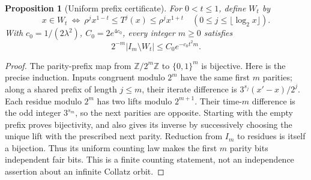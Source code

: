 \documentclass[11pt]{article}
\newtheorem{proposition}{Proposition}
\theoremstyle{remark}\newtheorem{remark}[proposition]{Remark}
\begin{document}
\begin{proposition}[Uniform prefix certificate]
\label{prop:shaik-prefix-uniform}
For \(0<t\le1\), define \(W_t\) by
\[
 x\in W_t\ \Longleftrightarrow\
 \rho^j x^{1-t}\le T^j(x)\le\rho^j x^{1+t}
 \quad(0\le j\le\lfloor\log_2x\rfloor).
\]
With \(c_0=1/(2\lambda^2)\), \(C_0=2e^{4c_0}\), every integer
\(m\ge0\) satisfies
\begin{equation}\label{eq:shaik-prefix-uniform}
 2^{-m}|I_m\setminus W_t|\le C_0e^{-c_0t^2m}.
\end{equation}
\end{proposition}
\begin{proof}
The parity-prefix map from \(\mathbb Z/2^m\mathbb Z\) to
\(\{0,1\}^m\) is bijective. Here is the precise induction.
Inputs congruent modulo \(2^m\) have the same first \(m\) parities;
along a shared prefix of length \(j\le m\), their iterate difference
is \(3^{s_j}(x'-x)/2^j\). Each residue modulo \(2^m\) has two lifts
modulo \(2^{m+1}\). Their time-\(m\) difference is the odd integer
\(3^{s_m}\), so the next parities are opposite. Starting with the
empty prefix proves bijectivity, and also gives its inverse by
successively choosing the unique lift with the prescribed next parity.
Reduction from \(I_m\) to residues is itself a bijection. Thus its
uniform counting law makes the first \(m\) parity bits independent fair
bits. This is a finite counting statement, not an independence
assertion about an infinite Collatz orbit.


\end{proof}
\end{document}
